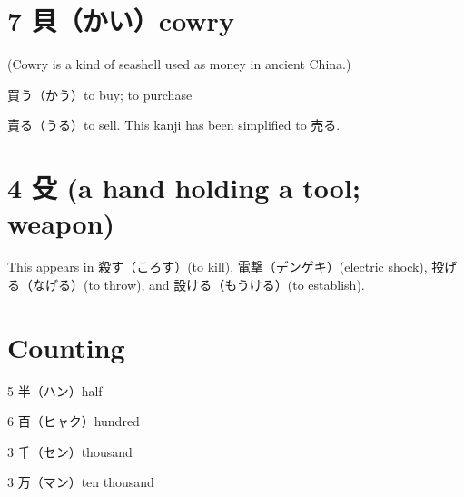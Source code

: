 \section{7 貝（かい）cowry}

(Cowry is a kind of seashell used as money in ancient China.)

買う（かう）to buy; to purchase

賣る（うる）to sell.
This kanji has been simplified to 売る.

\section{4 殳 (a hand holding a tool; weapon)}

This appears in
殺す（ころす）(to kill),
電撃（デンゲキ）(electric shock),
投げる（なげる）(to throw),
and 設ける（もうける）(to establish).

\section{Counting}

5 半（ハン）half

6 百（ヒャク）hundred

3 千（セン）thousand

3 万（マン）ten thousand
